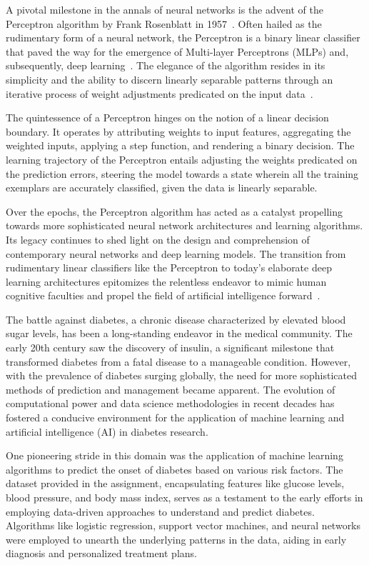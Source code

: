 \documentclass[10pt,twocolumn,letterpaper]{article}
\begin{document}
A pivotal milestone in the annals of neural networks is the advent of the Perceptron algorithm by Frank Rosenblatt in 1957~\cite{Crowell1965, Rhee1976}. Often hailed as the rudimentary form of a neural network, the Perceptron is a binary linear classifier that paved the way for the emergence of Multi-layer Perceptrons (MLPs) and, subsequently, deep learning~\cite{Boubiche1969}. The elegance of the algorithm resides in its simplicity and the ability to discern linearly separable patterns through an iterative process of weight adjustments predicated on the input data~\cite{Boubiche1969, McMillen1968}.

The quintessence of a Perceptron hinges on the notion of a linear decision boundary. It operates by attributing weights to input features, aggregating the weighted inputs, applying a step function, and rendering a binary decision. The learning trajectory of the Perceptron entails adjusting the weights predicated on the prediction errors, steering the model towards a state wherein all the training exemplars are accurately classified, given the data is linearly separable.

Over the epochs, the Perceptron algorithm has acted as a catalyst propelling towards more sophisticated neural network architectures and learning algorithms. Its legacy continues to shed light on the design and comprehension of contemporary neural networks and deep learning models. The transition from rudimentary linear classifiers like the Perceptron to today's elaborate deep learning architectures epitomizes the relentless endeavor to mimic human cognitive faculties and propel the field of artificial intelligence forward~\cite{Du2022}.

The battle against diabetes, a chronic disease characterized by elevated blood sugar levels, has been a long-standing endeavor in the medical community\cite{Kang2021, Elghamrawy2020}. The early 20th century saw the discovery of insulin, a significant milestone that transformed diabetes from a fatal disease to a manageable condition. However, with the prevalence of diabetes surging globally, the need for more sophisticated methods of prediction and management became apparent. The evolution of computational power and data science methodologies in recent decades has fostered a conducive environment for the application of machine learning and artificial intelligence (AI) in diabetes research\cite{Bukhari2021}.

One pioneering stride in this domain was the application of machine learning algorithms to predict the onset of diabetes based on various risk factors. The dataset provided in the assignment, encapsulating features like glucose levels, blood pressure, and body mass index, serves as a testament to the early efforts in employing data-driven approaches to understand and predict diabetes. Algorithms like logistic regression, support vector machines, and neural networks were employed to unearth the underlying patterns in the data, aiding in early diagnosis and personalized treatment plans.
\end{document}
